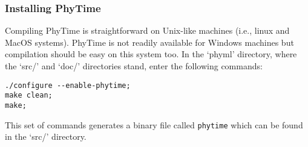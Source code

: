 \documentclass[a4paper,12pt]{article}
\newcommand{\x}[1]{\texttt{#1}}
\begin{document}
\subsubsection{Installing PhyTime}

Compiling PhyTime is straightforward on Unix-like  machines (i.e., linux and MacOS systems). PhyTime
is not readily available for Windows machines but  compilation should be easy on this system too. In
the `phyml' directory, where the `src/' and `doc/' directories stand, enter the following commands:
{\setlength{\baselineskip}{0.5\baselineskip}
\begin{verbatim}
./configure --enable-phytime;
make clean;
make;
\end{verbatim} } This set of commands generates  a binary file called \x{phytime} which can be found
  in the `src/' directory.
\end{document}
